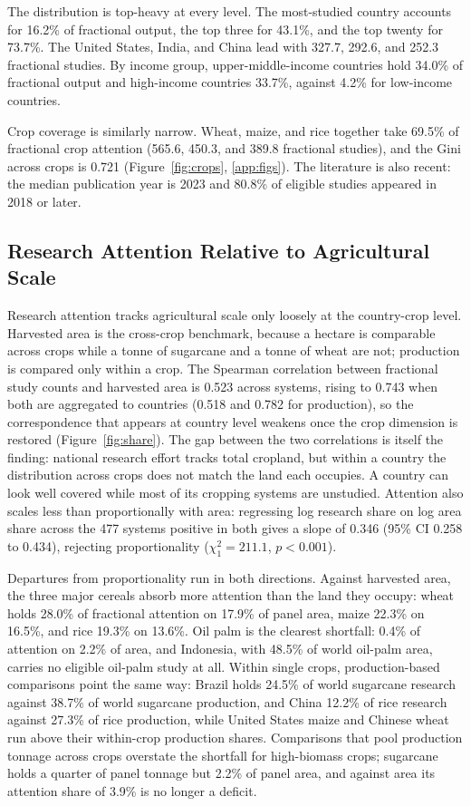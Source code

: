 \documentclass[ASNA,twocolumn]{USG}
\begin{document}
The distribution is top-heavy at every level. The most-studied country accounts for 16.2\% of fractional output, the top three for 43.1\%, and
the top twenty for 73.7\%. The United States, India, and China lead with 327.7, 292.6, and 252.3
fractional studies. By income group, upper-middle-income countries hold 34.0\% of fractional output
and high-income countries 33.7\%, against 4.2\% for low-income countries.

Crop coverage is similarly narrow. Wheat, maize, and rice together take 69.5\% of fractional crop attention (565.6, 450.3, and 389.8
fractional studies), and the Gini across crops is 0.721 (Figure~\ref{fig:crops}, \ref{app:figs}). The literature is also recent: the median
publication year is 2023 and 80.8\% of eligible studies appeared in 2018 or later.

\subsection{Research Attention Relative to Agricultural Scale}

Research attention tracks agricultural scale only loosely at the country-crop level.
Harvested area is the cross-crop benchmark, because a hectare is comparable across crops
while a tonne of sugarcane and a tonne of wheat are not; production is compared only within
a crop. The Spearman correlation between fractional study counts and harvested area is 0.523 across
systems, rising to 0.743 when both are aggregated to countries (0.518 and 0.782 for production), so the
correspondence that appears at country level weakens once the crop dimension is restored
(Figure~\ref{fig:share}). The gap between the two correlations is itself the finding: national research effort tracks total
cropland, but within a country the distribution across crops does not match the land each occupies.
A country can look well covered while most of its cropping systems are unstudied. Attention also
scales less than proportionally with area: regressing log research share on log area share across
the 477 systems positive in both gives a slope of 0.346 (95\% CI 0.258 to 0.434), rejecting
proportionality ($\chi^{2}_{1} = 211.1$, $p < 0.001$).

Departures from proportionality run in both directions. Against harvested area, the three
major cereals absorb more attention than the land they occupy: wheat holds 28.0\% of
fractional attention on 17.9\% of panel area, maize 22.3\% on 16.5\%, and rice 19.3\% on
13.6\%. Oil palm is the clearest shortfall: 0.4\% of attention on 2.2\% of area, and
Indonesia, with 48.5\% of world oil-palm area, carries no eligible oil-palm study at all.
Within single crops, production-based comparisons point the same way: Brazil holds 24.5\%
of world sugarcane research against 38.7\% of world sugarcane production, and China 12.2\%
of rice research against 27.3\% of rice production, while United States maize and Chinese
wheat run above their within-crop production shares. Comparisons that pool production
tonnage across crops overstate the shortfall for high-biomass crops; sugarcane holds a
quarter of panel tonnage but 2.2\% of panel area, and against area its attention share of
3.9\% is no longer a deficit.
\end{document}
